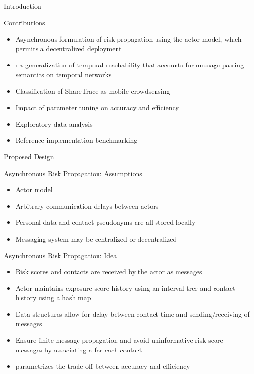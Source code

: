 \documentclass[11pt]{beamer}
\begin{document}
\begin{section}{Introduction}
\begin{frame}{Contributions}
\begin{itemize}
  \item Asynchronous formulation of risk propagation using the actor model, which permits a decentralized deployment
  \pause
  \item {}: a generalization of temporal reachability that accounts for message-passing semantics on temporal networks
  \pause
  \item Classification of ShareTrace as mobile crowdsensing
  \pause
  \item Impact of parameter tuning on accuracy and efficiency
  \pause
  \item Exploratory data analysis
  \pause
  \item Reference implementation benchmarking
\end{itemize}
\end{frame}

\end{section}

\begin{section}{Proposed Design}

\begin{frame}{Asynchronous Risk Propagation: Assumptions}
\begin{itemize}
  \item Actor model \citep{Hewitt1973, Hewitt1977a, Hewitt1977b, Agha1985}
  \pause
  \item Arbitrary communication delays between actors
  \pause
  \item Personal data and contact pseudonyms are all stored locally
  \pause
  \item Messaging system may be centralized or decentralized
\end{itemize}
\end{frame}

\begin{frame}{Asynchronous Risk Propagation: Idea}
\begin{itemize}
  \item Risk scores and contacts are received by the actor as messages
  \pause
  \item Actor maintains exposure score history using an interval tree and contact history using a hash map
  \pause
  \item Data structures allow for delay between contact time and sending/receiving of messages
  \pause
  \item Ensure finite message propagation and avoid uninformative risk score messages by associating a  for each contact
  \pause
  \item {} parametrizes the trade-off between accuracy and efficiency
\end{itemize}
\end{frame}

\end{section}
\end{document}
